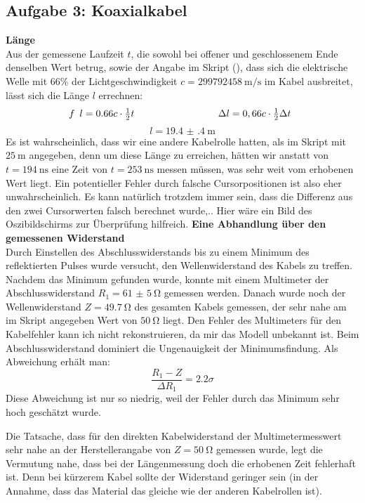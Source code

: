 \subsection{Aufgabe 3: Koaxialkabel}
\textbf{Länge}\\
Aus der gemessene Laufzeit \(t\), die sowohl bei offener und geschlossenem Ende denselben Wert betrug, sowie der Angabe im Skript (\autocite{Skript_1}), dass sich die elektrische Welle mit 66\% der Lichtgeschwindigkeit \(c=\qty{299792458}{\m\per\s}\) im Kabel ausbreitet, lässt sich die Länge \(l\) errechnen:
\begin{equation}f
\begin{array}{c@{\hspace{3cm}}c}
 l = 0.66c \cdot \frac{1}{2} t& \Delta l=0,66c \cdot \frac{1}{2} \Delta t
\end{array}
\end{equation}
\[l=\qty{19.4(4)}{\m}\]
Es ist wahrscheinlich, dass wir eine andere Kabelrolle hatten, als im Skript mit \(\qty{25}{\m}\) angegeben, denn um diese Länge zu erreichen, hätten wir anstatt von \(t=\qty{194}{\nano\s}\) eine Zeit von \(t=\qty{253}{\nano\s}\) messen müssen, was sehr weit vom erhobenen Wert liegt.
Ein potentieller Fehler durch falsche Cursorpositionen ist also eher unwahrscheinlich. Es kann natürlich trotzdem immer sein, dass die Differenz aus den zwei Cursorwerten falsch berechnet wurde,.. Hier wäre ein Bild des Oszibildschirms zur Überprüfung hilfreich. 
\newpage
\textbf{Eine Abhandlung über den gemessenen Widerstand}\\
Durch Einstellen des Abschlusswiderstands bis zu einem Minimum des reflektierten Pulses wurde versucht, den Wellenwiderstand des Kabels zu treffen. Nachdem das Minimum gefunden wurde, konnte mit einem Multimeter der Abschlusswiderstand \(R_1=\qty{61(5)}{\ohm}\) gemessen werden. Danach wurde noch der Wellenwiderstand \(Z=\qty{49.7}{\ohm}\) des gesamten Kabels gemessen, der sehr nahe am im Skript angegeben Wert von \(\qty{50}{\ohm}\) liegt. Den Fehler des Multimeters für den Kabelfehler kann ich nicht rekonstruieren, da mir das Modell unbekannt ist. Beim Abschlusswiderstand dominiert die Ungenauigkeit der Minimumsfindung.
Als Abweichung erhält man:
\begin{equation}
    \frac{R_1-Z}{\Delta R_1}=2.2\sigma
\end{equation}
Diese Abweichung ist nur so niedrig, weil der Fehler durch das Minimum sehr hoch geschätzt wurde.

Die Tatsache, dass für den direkten Kabelwiderstand der Multimetermesswert sehr nahe an der Herstellerangabe von \(Z=\qty{50}{\ohm}\) gemessen wurde, legt die Vermutung nahe, dass bei der Längenmessung doch die erhobenen Zeit fehlerhaft ist. Denn bei kürzerem Kabel sollte der Widerstand geringer sein (in der Annahme, dass das Material das gleiche wie der anderen Kabelrollen ist).

